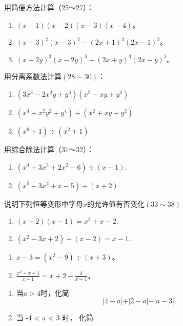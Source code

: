 用简便方法计算（25～27）：

\begin{enumerate}[start=25]
\item
  \((x - 1)(x - 2)(x - 3)(x - 4)\)。
\item
  \((x + 3)^{2}(x - 3)^{2} - (2x + 1)^{2}(2x - 1)^{2}\)。
\item
  \((x + 2y)^{3}(x - 2y)^{3} - (2x + y)^{3}(2x - y)^{3}\)。
\end{enumerate}

用分离系数法计算\((28\sim30)\)：

\begin{enumerate}[start=28]
\item
  \((3x^{3} - 2x^{2}y + y^{3})(x^{2} - xy + y^{2})\)
\item
  \((x^{4} + x^{2}y^{2} + y^{4})\div (x^{2} + xy + y^{2})\)
\item
  \((x^{6} + 1)\div (x^{2} + 1)\)
\end{enumerate}

用综合除法计算（31～32）：

\begin{enumerate}[start=31]
\item
  \((x^{4} + 3x^{3} + 2x^{2} - 6)\div (x - 1).\)
\item
  \((x^{5} - 3x^{2} + x - 5)\div (x + 2)\)
\end{enumerate}

说明下列恒等变形中字母\(x\)的允许值有否变化\((33\sim 38)\)

\begin{enumerate}[start=33]
\item
  \((x + 2)(x - 1) = x^2 + x - 2.\)
\item
  \((x^{2} - 3x + 2)\div (x - 2) = x - 1.\)
\end{enumerate}

\begin{enumerate}[start=35]
\item
  \(x - 3 = (x^2 - 9) \div (x + 3)\)。
\item
  \(\frac{x^2 + x + 1}{x - 1} = x + 2 - \frac{3}{x - 1}\)。
\end{enumerate}

\begin{enumerate}[start=37]
\item
  当\(a > 4\)时，化简
\[
\vert 4 - a \vert + \vert 2 - a \vert - \vert a - 3 \vert .
\]
\item
  当 -4 \textless{} a \textless{} 3 时， 化简
\end{enumerate}

